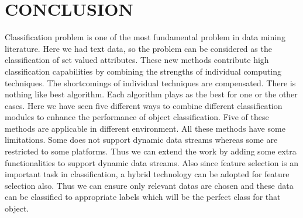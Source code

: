 \documentclass[10pt,a4paper,journal]{IEEEtran}
\begin{document}
\section{CONCLUSION}
\hspace{2em}
Classification problem is one of the most fundamental problem in data mining literature. Here we had text data, so the problem can be considered as the classification of set valued attributes. These new methods contribute high classification capabilities by combining the strengths of individual computing techniques.
The shortcomings of individual techniques are compensated. There is nothing like best algorithm. Each algorithm plays as the best for one or the other cases. Here we have seen five different ways to combine different classification modules to enhance the performance of object classification. Five of these methods are applicable in different environment. All these methods have some limitations. Some does not support dynamic data streams whereas some are restricted to some platforms. Thus we can extend the work by adding some extra functionalities to support dynamic data streams. Also since feature selection is an important task in classification, a hybrid technology can be adopted for feature selection also. Thus we can ensure only relevant datas are chosen and these data can be classified to appropriate labels which will be the perfect class for that object.      


\end{document}
